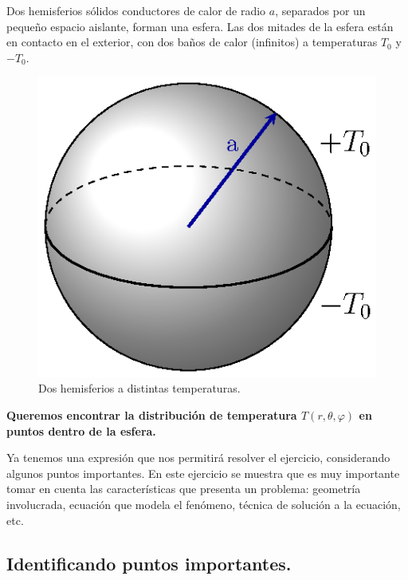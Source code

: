 \documentclass[12pt]{article}
\numberwithin{equation}{section}
\begin{document}
Dos hemisferios sólidos conductores de calor de radio $a$, separados por un pequeño espacio aislante, forman una esfera. Las dos mitades de la esfera están en contacto en el exterior, con dos baños de calor (infinitos) a temperaturas $T_{0}$ y $-T_{0}$.
\begin{figure}[H]
    \centering
    \includegraphics[scale=1.2]{Imagenes/Ejemplo_Esfera_01.eps}
    \caption{Dos hemisferios a distintas temperaturas.}
    \label{fig:figura_esfera_01}
\end{figure}
\textbf{Queremos encontrar la distribución de temperatura $T (r, \theta, \varphi)$ en puntos dentro de la esfera.}
\par
Ya tenemos una expresión que nos permitirá resolver el ejercicio, considerando algunos puntos importantes. En este ejercicio se muestra que es muy importante tomar en cuenta las características que presenta un problema: geometría involucrada, ecuación que modela el fenómeno, técnica de solución a la ecuación, etc.

\subsection{Identificando puntos importantes.}
\end{document}
